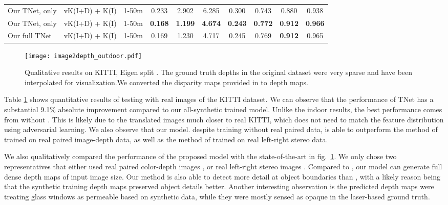 \documentclass[runningheads]{llncs}
\begin{document}
\begin{table}[tb!]
\begin{center}
\begin{tabular}{|l|c|c|c|c|c|c|c|c|c|}
			\rowcolor[rgb]{0.9,0.9,0.9}
			Our TNet,  only & vK(I+D) + K(I) & 1-50m &  0.233 & 2.902 & 6.285 & 0.300 & 0.743 & 0.880 & 0.938\\
			\rowcolor[rgb]{0.9,0.9,0.9}
			Our TNet,  only&  vK(I+D) + K(I) & 1-50m & {\bf 0.168} & {\bf 1.199} & {\bf 4.674} & {\bf 0.243} & {\bf 0.772} & {\bf 0.912} & {\bf 0.966}\\
			\rowcolor[rgb]{0.9,0.9,0.9}
			Our full TNet &vK(I+D) + K(I) & 1-50m & 0.169 & 1.230 & 4.717& 0.245 & 0.769 &    {\bf 0.912} &   0.965  \\
			\hline
		\end{tabular}
		\label{table:outdoor}
	\end{center}
\end{table}

\begin{figure}[tb!]
	\centering
	\texttt{[image: image2depth\_outdoor.pdf]}
	\caption{Qualitative results on KITTI, Eigen split \cite{eigen2014depth}. The ground truth depths in the original dataset were very sparse and have been interpolated for visualization.We converted the disparity maps provided in \cite{godard2017unsupervised} to depth maps.}
	\label{fig:depth_outdoor}
\end{figure}

Table \ref{table:outdoor} shows quantitative results of testing with real images of the KITTI dataset. We can observe that the performance of TNet has a substantial 9.1\% absolute improvement compared to our all-synthetic trained model. Unlike the indoor results, the best performance comes from without . This is likely due to the translated images much closer to real KITTI, which does not need to match the feature distribution using  adversarial learning. We also observe that our model. despite training without real paired data, is able to outperform the method of \cite{eigen2014depth} trained on real paired image-depth data, as well as the method of  \cite{garg2016unsupervised} trained on real left-right stereo data.

We also qualitatively compared the performance of the proposed model with the state-of-the-art in fig.~\ref{fig:depth_outdoor}. We only chose two representatives that either used real paired color-depth images \cite{eigen2014depth}, or real left-right stereo images \cite{godard2017unsupervised}. Compared to \cite{eigen2014depth}, our model can generate full dense depth maps of input image size. Our method is also able to detect more detail at object boundaries than \cite{godard2017unsupervised}, with a likely reason being that the synthetic training depth maps preserved object details better. Another interesting observation is the predicted depth maps were treating glass windows as permeable based on synthetic data, while they were mostly sensed as opaque in the laser-based ground truth.
\end{document}
